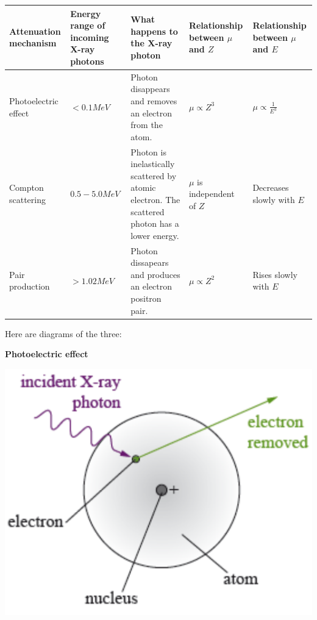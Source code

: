 \documentclass{article}
\begin{document}
\begin{landscape}
\begin{table}
\centering
\def\arraystretch{1.5}
\begin{tabular}{|x{2cm}|x{3cm}|x{5cm}|x{3cm}|x{3cm}|}

	\hline
	
	{\bf Attenuation mechanism} & 
	{\bf Energy range of incoming X-ray photons} & 
	{\bf What happens to the X-ray photon} & 
	{\bf Relationship between $\mu$ and $Z$} & 
	{\bf Relationship between $\mu$ and $E$} \\ \hline

	Photoelectric effect & $<0.1MeV$ & Photon disappears and removes an electron from the atom. & $\mu \propto Z^3$ & $\mu \propto \frac{1}{E^3}$ \\ \hline

	Compton scattering & $0.5-5.0MeV$ & Photon is inelastically scattered by atomic electron. The scattered photon has a lower energy. & $\mu$ is independent of $Z$ & Decreases slowly with $E$ \\ \hline

	Pair production & $>1.02MeV$ & Photon dissapears and produces an electron positron pair. & $\mu \propto Z^2$ & Rises slowly with $E$ \\ \hline

\end{tabular}

\end{table}
\end{landscape}

Here are diagrams of the three:

{\bf Photoelectric effect}

\begin{center}
\includegraphics[scale=0.3]{photoelectric}
\end{center}
\end{document}
